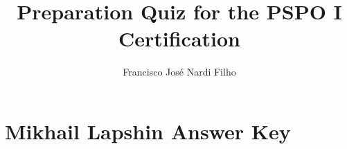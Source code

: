 \documentclass[a4paper,11pt]{article}
\begin{document}
\title{\bf{Preparation Quiz for the PSPO I Certification}}
\author{Francisco Jos\'e Nardi Filho}
\date{}
\maketitle


%
\section{Mikhail Lapshin Answer Key}

\end{document}
